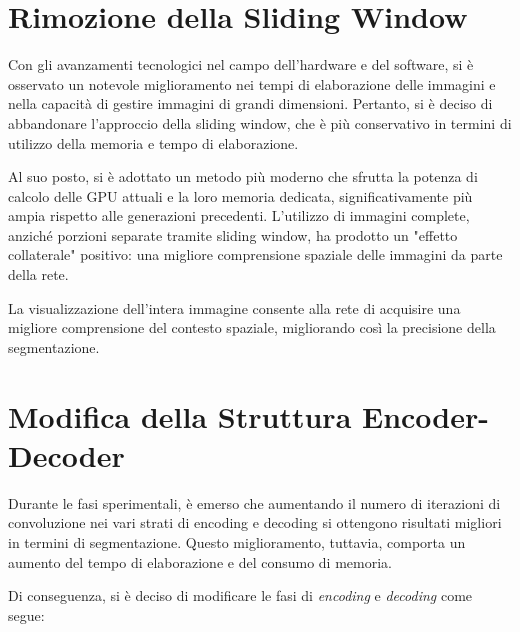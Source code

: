\section{Rimozione della Sliding Window}
\label{sub:Rimozione sliding window}

Con gli avanzamenti tecnologici nel campo dell'hardware e del software, si è osservato un notevole
miglioramento nei tempi di elaborazione delle immagini e nella capacità di gestire immagini di
grandi dimensioni. Pertanto, si è deciso di abbandonare l'approccio della sliding window, che è più
conservativo in termini di utilizzo della memoria e tempo di elaborazione.

Al suo posto, si è adottato un metodo più moderno che sfrutta la potenza di calcolo delle GPU
attuali e la loro memoria dedicata, significativamente più ampia rispetto alle generazioni
precedenti. L'utilizzo di immagini complete, anziché porzioni separate tramite sliding window, ha
prodotto un "effetto collaterale" positivo: una migliore comprensione spaziale delle immagini da
parte della rete.

La visualizzazione dell'intera immagine consente alla rete di acquisire una migliore comprensione
del contesto spaziale, migliorando così la precisione della segmentazione.


\section{Modifica della Struttura Encoder-Decoder}
\label{sub:Modifica Encoder-Decoder}

Durante le fasi sperimentali, è emerso che aumentando il numero di iterazioni di convoluzione nei
vari strati di encoding e decoding si ottengono risultati migliori in termini di segmentazione.
Questo miglioramento, tuttavia, comporta un aumento del tempo di elaborazione e del consumo di
memoria.

Di conseguenza, si è deciso di modificare le fasi di \textit{encoding} e \textit{decoding} come segue:

